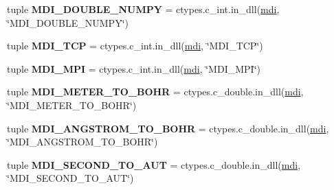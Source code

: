 \begin{DoxyCompactItemize}
\item 
\hypertarget{namespacemolssi__driver__interface_1_1mdi_ae23a31205ba45db924a6cd8f6851c301}{tuple {\bfseries M\-D\-I\-\_\-\-D\-O\-U\-B\-L\-E\-\_\-\-N\-U\-M\-P\-Y} = ctypes.\-c\-\_\-int.\-in\-\_\-dll(\hyperlink{classmdi}{mdi}, \char`\"{}M\-D\-I\-\_\-\-D\-O\-U\-B\-L\-E\-\_\-\-N\-U\-M\-P\-Y\char`\"{})}\label{namespacemolssi__driver__interface_1_1mdi_ae23a31205ba45db924a6cd8f6851c301}

\item 
\hypertarget{namespacemolssi__driver__interface_1_1mdi_a2cd83c28d46d7488dc81d0ab7d1e1b11}{tuple {\bfseries M\-D\-I\-\_\-\-T\-C\-P} = ctypes.\-c\-\_\-int.\-in\-\_\-dll(\hyperlink{classmdi}{mdi}, \char`\"{}M\-D\-I\-\_\-\-T\-C\-P\char`\"{})}\label{namespacemolssi__driver__interface_1_1mdi_a2cd83c28d46d7488dc81d0ab7d1e1b11}

\item 
\hypertarget{namespacemolssi__driver__interface_1_1mdi_a232cbdf0cd4b5f002a1163a9f71c5330}{tuple {\bfseries M\-D\-I\-\_\-\-M\-P\-I} = ctypes.\-c\-\_\-int.\-in\-\_\-dll(\hyperlink{classmdi}{mdi}, \char`\"{}M\-D\-I\-\_\-\-M\-P\-I\char`\"{})}\label{namespacemolssi__driver__interface_1_1mdi_a232cbdf0cd4b5f002a1163a9f71c5330}

\item 
\hypertarget{namespacemolssi__driver__interface_1_1mdi_a05bc005cf82c527130e4b3517355d24d}{tuple {\bfseries M\-D\-I\-\_\-\-M\-E\-T\-E\-R\-\_\-\-T\-O\-\_\-\-B\-O\-H\-R} = ctypes.\-c\-\_\-double.\-in\-\_\-dll(\hyperlink{classmdi}{mdi}, \char`\"{}M\-D\-I\-\_\-\-M\-E\-T\-E\-R\-\_\-\-T\-O\-\_\-\-B\-O\-H\-R\char`\"{})}\label{namespacemolssi__driver__interface_1_1mdi_a05bc005cf82c527130e4b3517355d24d}

\item 
\hypertarget{namespacemolssi__driver__interface_1_1mdi_a56a1ab0c7e9e1e0e55af72a20d1d0e3a}{tuple {\bfseries M\-D\-I\-\_\-\-A\-N\-G\-S\-T\-R\-O\-M\-\_\-\-T\-O\-\_\-\-B\-O\-H\-R} = ctypes.\-c\-\_\-double.\-in\-\_\-dll(\hyperlink{classmdi}{mdi}, \char`\"{}M\-D\-I\-\_\-\-A\-N\-G\-S\-T\-R\-O\-M\-\_\-\-T\-O\-\_\-\-B\-O\-H\-R\char`\"{})}\label{namespacemolssi__driver__interface_1_1mdi_a56a1ab0c7e9e1e0e55af72a20d1d0e3a}

\item 
\hypertarget{namespacemolssi__driver__interface_1_1mdi_ab087d6326f12a106a44d4ddaca4c8608}{tuple {\bfseries M\-D\-I\-\_\-\-S\-E\-C\-O\-N\-D\-\_\-\-T\-O\-\_\-\-A\-U\-T} = ctypes.\-c\-\_\-double.\-in\-\_\-dll(\hyperlink{classmdi}{mdi}, \char`\"{}M\-D\-I\-\_\-\-S\-E\-C\-O\-N\-D\-\_\-\-T\-O\-\_\-\-A\-U\-T\char`\"{})}\label{namespacemolssi__driver__interface_1_1mdi_ab087d6326f12a106a44d4ddaca4c8608}


\end{DoxyCompactItemize}
